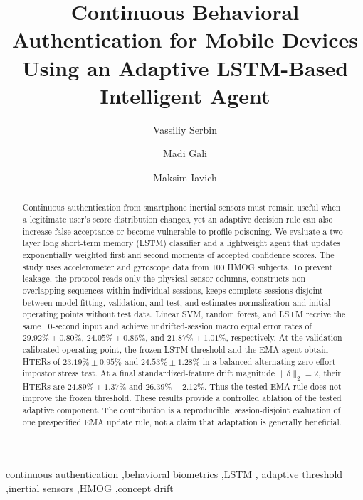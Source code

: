 \documentclass[3p,times,procedia]{elsarticle}
\begin{document}
\begin{frontmatter}

\title{Continuous Behavioral Authentication for Mobile Devices
Using an Adaptive LSTM-Based Intelligent Agent}

\author[a]{Vassiliy Serbin}
\author[b]{Madi Gali}
\author[c]{Maksim Iavich}
\address[a]{Department of Information Systems, Institute of Automation and
Information Technologies, Satbayev University, Almaty 050013, Kazakhstan}
\address[b]{Department of Cybersecurity, Institute of Automation and
Information Technologies, Satbayev University, Almaty 050013, Kazakhstan}
\address[c]{Caucasus School of Technologies, Caucasus University, Tbilisi, Georgia}

\begin{abstract}
Continuous authentication from smartphone inertial sensors must remain useful
when a legitimate user's score distribution changes, yet an adaptive decision
rule can also increase false acceptance or become vulnerable to profile
poisoning. We evaluate a two-layer long short-term memory (LSTM) classifier and
a lightweight agent that updates exponentially weighted first and second
moments of accepted confidence scores. The study uses accelerometer and
gyroscope data from 100 HMOG subjects. To prevent leakage, the protocol reads
only the physical sensor columns, constructs non-overlapping sequences within individual
sessions, keeps complete sessions disjoint between model fitting, validation,
and test, and estimates normalization and initial operating points without test
data. Linear SVM, random forest, and LSTM receive the same 10-second input and
achieve undrifted-session macro equal error rates of $29.92\%\pm0.80\%$,
$24.05\%\pm0.86\%$, and $21.87\%\pm1.01\%$, respectively. At the validation-calibrated
operating point, the frozen LSTM threshold and the EMA agent obtain HTERs of
$23.19\%\pm0.95\%$ and $24.53\%\pm1.28\%$ in a balanced alternating
zero-effort impostor stress test. At a final standardized-feature drift magnitude
$\lVert\delta\rVert_2=2$, their HTERs are $24.89\%\pm1.37\%$ and
$26.39\%\pm2.12\%$. Thus the tested EMA rule does not improve the frozen
threshold. These results provide a controlled ablation of the tested adaptive
component. The contribution is a reproducible, session-disjoint evaluation of
one prespecified EMA update rule, not a claim that adaptation is generally
beneficial.
\end{abstract}

\begin{keyword}
continuous authentication \sep behavioral biometrics \sep LSTM \sep
adaptive threshold \sep inertial sensors \sep HMOG \sep concept drift
\end{keyword}
\end{frontmatter}
\end{document}
